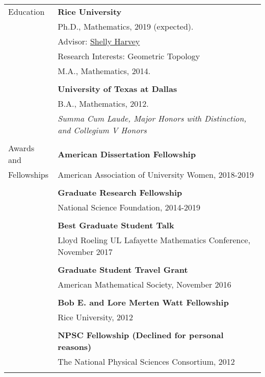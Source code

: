 \documentclass[letterpaper,11pt,oneside]{article}
\begin{document}
\noindent \begin{tabular}{@{} l l}
 \Large{Education}    & \textbf{Rice University} \\
     & Ph.D., Mathematics, 2019 (expected). \\
     & Advisor: \href{www.math.rice.edu/~shelly}{Shelly Harvey} \\
     & Research Interests:  Geometric Topology \\
     & M.A., Mathematics, 2014. \\
     & \\
     & \textbf{University of Texas at Dallas} \\
     & B.A., Mathematics, 2012. \\
      & \sl{Summa Cum Laude, Major Honors with Distinction, and Collegium V Honors} \\
     & \\
      \Large{Awards and }    & \textbf{American Dissertation Fellowship} \\
  \Large{Fellowships}   & American Association of University Women, 2018-2019 \\
     & \\
     & \textbf{Graduate Research Fellowship} \\
     & National Science Foundation, 2014-2019 \\
     & \\
     
         & \textbf{Best Graduate Student Talk} \\
     & Lloyd Roeling UL Lafayette Mathematics Conference, November 2017 \\
     & \\
      & \textbf{Graduate Student Travel Grant} \\
     & American Mathematical Society, November 2016 \\
      & \\
        & \textbf{Bob E. and Lore Merten Watt Fellowship } \\
     & Rice University, 2012 \\
     & \\
     
          & \textbf{NPSC Fellowship (Declined for personal reasons)} \\
     & The National Physical Sciences Consortium, 2012 \\
     & \\
     
 
    

\end{tabular}
\end{document}
